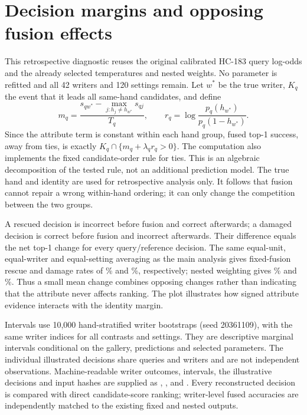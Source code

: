 \documentclass[10pt,a4paper]{article}
\begin{document}
\FloatBarrier
\section{Decision margins and opposing fusion effects}
\label{sec:margins}
This retrospective diagnostic reuses the original calibrated HC-183 query log-odds and the already selected temperatures and nested weights. No parameter is refitted and all 42 writers and 120 settings remain. Let $w^*$ be the true writer, $K_q$ the event that it leads all same-hand candidates, and define
\[
 m_q=\frac{s_{qw^*}-\max_{j:h_j\ne h_{w^*}}s_{qj}}{T_q},\qquad
 r_q=\log\frac{p_q(h_{w^*})}{p_q(1-h_{w^*})}.
\]
Since the attribute term is constant within each hand group, fused top-1 success, away from ties, is exactly $K_q\cap\{m_q+\lambda_qr_q>0\}$. The computation also implements the fixed candidate-order rule for ties. This is an algebraic decomposition of the tested rule, not an additional prediction model. The true hand and identity are used for retrospective analysis only. It follows that fusion cannot repair a wrong within-hand ordering; it can only change the competition between the two groups.

A rescued decision is incorrect before fusion and correct afterwards; a damaged decision is correct before fusion and incorrect afterwards. Their difference equals the net top-1 change for every query/reference decision. The same equal-unit, equal-writer and equal-setting averaging as the main analysis gives fixed-fusion rescue and damage rates of \rFixedRescued\% and \rFixedDamaged\%, respectively; nested weighting gives \rNestedRescued\% and \rNestedDamaged\%. Thus a small mean change combines opposing changes rather than indicating that the attribute never affects ranking. The plot illustrates how signed attribute evidence interacts with the identity margin.

Intervals use 10,000 hand-stratified writer bootstraps (seed 20361109), with the same writer indices for all contrasts and settings. They are descriptive marginal intervals conditional on the gallery, predictions and selected parameters. The individual illustrated decisions share queries and writers and are not independent observations. Machine-readable writer outcomes, intervals, the illustrative decisions and input hashes are supplied as , ,  and . Every reconstructed decision is compared with direct candidate-score ranking; writer-level fused accuracies are independently matched to the existing fixed and nested outputs.
\end{document}
